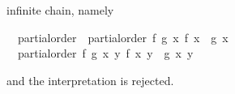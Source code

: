\begin{isabellebody}
\begin{isamarkuptext}
  infinite chain, namely
  \begin{isabelle}%
\ \ partial{}order\ {}\ partial{}order\ {}{}f\ g{}\ {}x{}\ f\ x\ {}\ g\ x{}\ {}\isanewline
\isaindent{\ \ }\ \ partial{}order\ {}{}f\ g{}\ {}x\ y{}\ f\ x\ y\ {}\ g\ x\ y{}\ {}\ \ {}%
\end{isabelle}
  and the interpretation is rejected.


\end{isamarkuptext}
\end{isabellebody}
